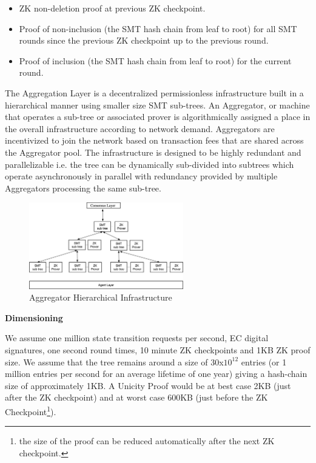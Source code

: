 \documentclass{article}
\begin{document}
 \begin{itemize}
\setlength{\leftmargin}{1em}
\item ZK non-deletion proof at previous ZK checkpoint.
\item Proof of non-inclusion (the SMT hash chain from leaf to root) for all SMT rounds since the previous ZK checkpoint up to the previous round.
\item Proof of inclusion (the SMT hash chain from leaf to root) for the current round.
\end{itemize}


The Aggregation Layer is a decentralized permissionless infrastructure built in a hierarchical manner using smaller size SMT sub-trees. An Aggregator, or machine that operates a sub-tree or associated prover is algorithmically assigned a place in the overall infrastructure according to network demand. Aggregators are incentivized to join the network based on transaction fees that are shared across the Aggregator pool. The infrastructure is designed to be highly redundant and parallelizable i.e. the tree can be dynamically sub-divided into subtrees which operate asynchronously in parallel with redundancy provided by multiple Aggregators processing the same sub-tree.  


\begin{figure}[htbp]
    \centering
    \includegraphics[width=0.6\textwidth]{SMT-Infra.png}
    \caption{Aggregator Hierarchical Infrastructure}
    \label{fig:SMT-Infra}
\end{figure}

\textbf{Dimensioning}
\vspace{2mm}

We assume one million state transition requests per second, EC digital signatures, one second round times, 10 minute ZK checkpoints and 1KB ZK proof size. We assume that the tree remains around a size of 30x$10^{12}$ entries (or 1 million entries per second for an average lifetime of one year) giving a hash-chain size of approximately 1KB.
A Unicity Proof would be at best case 2KB (just after the ZK checkpoint) and at worst case 600KB (just before the ZK Checkpoint\footnote{the size of the proof can be reduced automatically after the next ZK checkpoint.}). 
\end{document}
